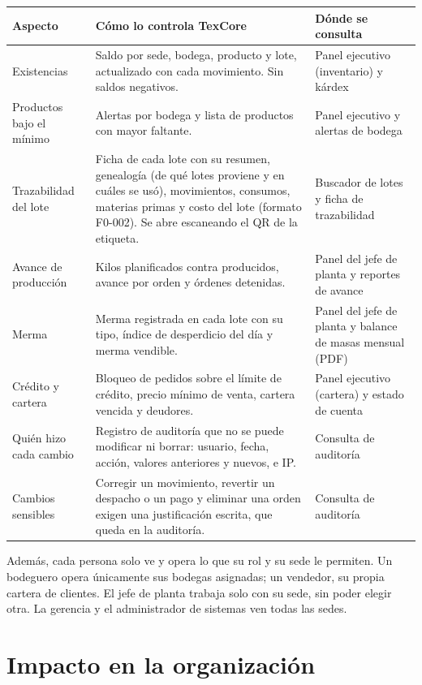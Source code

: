 \documentclass[11pt,a4paper]{article}
\newcommand{\encabezado}{\rowcolor{fondo}}
\begin{document}
\begin{center}
\begin{tabularx}{\textwidth}{P{3.0cm}LP{3.9cm}}
\toprule
\encabezado \textbf{Aspecto} & \textbf{Cómo lo controla TexCore} & \textbf{Dónde se consulta} \\
\midrule
Existencias & Saldo por sede, bodega, producto y lote, actualizado con cada movimiento. Sin saldos negativos. & Panel ejecutivo (inventario) y kárdex \\
Productos bajo el mínimo & Alertas por bodega y lista de productos con mayor faltante. & Panel ejecutivo y alertas de bodega \\
Trazabilidad del lote & Ficha de cada lote con su resumen, genealogía (de qué lotes proviene y en cuáles se usó), movimientos, consumos, materias primas y costo del lote (formato F0-002). Se abre escaneando el QR de la etiqueta. & Buscador de lotes y ficha de trazabilidad \\
Avance de producción & Kilos planificados contra producidos, avance por orden y órdenes detenidas. & Panel del jefe de planta y reportes de avance \\
Merma & Merma registrada en cada lote con su tipo, índice de desperdicio del día y merma vendible. & Panel del jefe de planta y balance de masas mensual (PDF) \\
Crédito y cartera & Bloqueo de pedidos sobre el límite de crédito, precio mínimo de venta, cartera vencida y deudores. & Panel ejecutivo (cartera) y estado de cuenta \\
Quién hizo cada cambio & Registro de auditoría que no se puede modificar ni borrar: usuario, fecha, acción, valores anteriores y nuevos, e IP. & Consulta de auditoría \\
Cambios sensibles & Corregir un movimiento, revertir un despacho o un pago y eliminar una orden exigen una justificación escrita, que queda en la auditoría. & Consulta de auditoría \\
\bottomrule
\end{tabularx}
\end{center}

Además, cada persona solo ve y opera lo que su rol y su sede le permiten. Un bodeguero opera únicamente sus bodegas asignadas; un vendedor, su propia cartera de clientes. El jefe de planta trabaja solo con su sede, sin poder elegir otra. La gerencia y el administrador de sistemas ven todas las sedes.

\section{Impacto en la organización}\label{sec:impacto}
\end{document}
